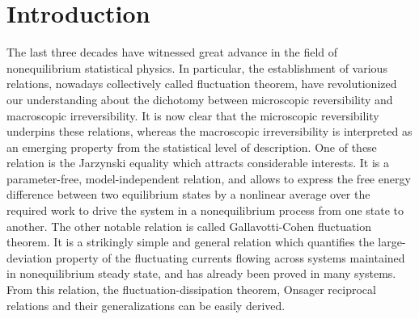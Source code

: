 \chapter{Introduction}\label{chap:introduction}






\par The last three decades have witnessed great advance in the field of nonequilibrium statistical physics. In particular, the establishment of various relations, nowadays collectively called fluctuation theorem, have revolutionized our understanding about the dichotomy between microscopic reversibility and macroscopic irreversibility. It is now clear that the microscopic reversibility underpins these relations, whereas the macroscopic irreversibility is interpreted as an emerging property from the statistical level of description. One of these relation is the Jarzynski equality which attracts considerable interests. It is a parameter-free, model-independent relation, and allows to express the free energy difference between two equilibrium states by a nonlinear average over the required work to drive the system in a nonequilibrium process from one state to another. The other notable relation is called Gallavotti-Cohen fluctuation theorem. It is a strikingly simple and general relation which quantifies the large-deviation property of the fluctuating currents flowing across systems maintained in nonequilibrium steady state, and has already been proved in many systems. From this relation, the fluctuation-dissipation theorem, Onsager reciprocal relations and their generalizations can be easily derived.
















